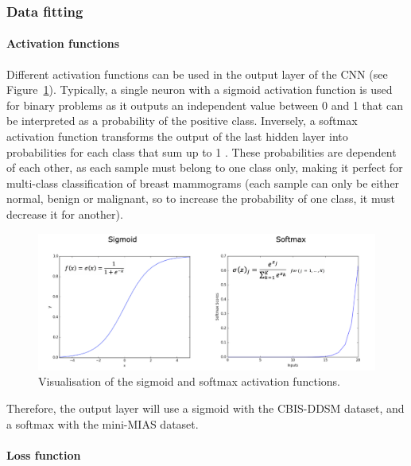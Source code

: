 \subsubsection{Data fitting}

\paragraph{Activation functions}

Different activation functions can be used in the output layer of the CNN (see Figure~\ref{fig:design-activation functions}). Typically, a single neuron with a sigmoid activation function is used for binary problems as it outputs an independent value between 0 and 1 that can be interpreted as a probability of the positive class. Inversely, a softmax activation function transforms the output of the last hidden layer into probabilities for each class that sum up to 1 \citep{Litjens2017}. These probabilities are dependent of each other, as each sample must belong to one class only, making it perfect for multi-class classification of breast mammograms (each sample can only be either normal, benign or malignant, so to increase the probability of one class, it must decrease it for another).

\begin{figure}[ht]
\centerline{\includegraphics[width=1.1\textwidth]{figures/design/activation functions.png}}
\caption{\label{fig:design-activation functions}Visualisation of the sigmoid and softmax activation functions.}
\end{figure}

Therefore, the output layer will use a sigmoid with the CBIS-DDSM dataset, and a softmax with the mini-MIAS dataset.

\paragraph{Loss function}

